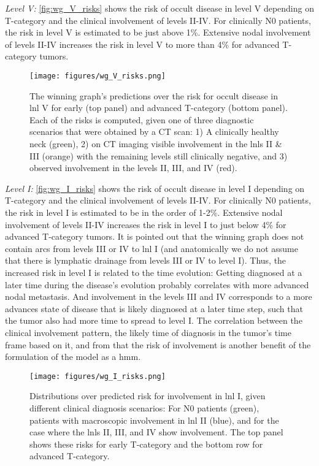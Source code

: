 \documentclass[twocolumn]{aastex631}
\begin{document}
{\it Level V:} \autoref{fig:wg_V_risks} shows the risk of occult disease in level V depending on T-category and the clinical involvement of levels II-IV. For clinically N0 patients, the risk in level V is estimated to be just above 1\%. Extensive nodal involvement of levels II-IV increases the risk in level V to more than 4\% for advanced T-category tumors. 

\begin{figure}
    \begin{centering}
        \texttt{[image: figures/wg\_V\_risks.png]}
        \caption{The winning graph's predictions over the risk for occult disease in \gls{lnl} V for early (top panel) and advanced T-category (bottom panel). Each of the risks is computed, given one of three diagnostic scenarios that were obtained by a CT scan: 1) A clinically healthy neck (green), 2) on CT imaging visible involvement in the \glspl{lnl} II \& III (orange) with the remaining levels still clinically negative, and 3) observed involvement in the levels II, III, and IV (red).\label{fig:wg_V_risks}}
    \end{centering}
\end{figure}

{\it Level I:} \autoref{fig:wg_I_risks} shows the risk of occult disease in level I depending on T-category and the clinical involvement of levels II-IV. For clinically N0 patients, the risk in level I is estimated to be in the order of 1-2\%. Extensive nodal involvement of levels II-IV increases the risk in level I to just below 4\% for advanced T-category tumors. It is pointed out that the winning graph does not contain arcs from levels III or IV to \gls{lnl} I (and anatomically we do not assume that there is lymphatic drainage from levels III or IV to level I). Thus, the increased risk in level I is related to the time evolution: Getting diagnosed at a later time during the disease's evolution probably correlates with more advanced nodal metastasis. And involvement in the levels III and IV corresponds to a more advances state of disease that is likely diagnosed at a later time step, such that the tumor also had more time to spread to level I. The correlation between the clinical involvement pattern, the likely time of diagnosis in the tumor's time frame based on it, and from that the risk of involvement is another benefit of the formulation of the model as a \gls{hmm}.

\begin{figure}
    \begin{centering}
        \texttt{[image: figures/wg\_I\_risks.png]}
        \caption{Distributions over predicted risk for involvement in \gls{lnl} I, given different clinical diagnosis scenarios: For N0 patients (green), patients with macroscopic involvement in \gls{lnl} II (blue), and for the case where the \glspl{lnl} II, III, and IV show involvement. The top panel shows these risks for early T-category and the bottom row for advanced T-category. \label{fig:wg_I_risks}}
    \end{centering}
\end{figure}
\end{document}
